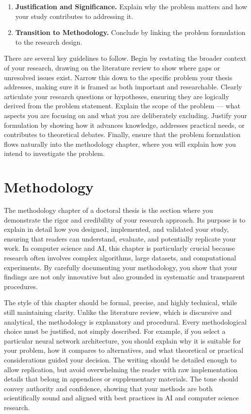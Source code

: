 \documentclass[PCOM,Thesis,Review]{mpThesis}
\newcommand{\Hd}[1]{{\color{SteelBlue}\bf#1.}}
\begin{document}
\begin{MainMatter}
\begin{Remark}
\begin{enumerate}
\item \Hd{Justification and Significance}
Explain why the problem matters and how your study contributes to addressing it.

\item \Hd{Transition to Methodology}
Conclude by linking the problem formulation to the research design.
\end{enumerate}

There are several key guidelines to follow.
Begin by restating the broader context of your research, drawing on the literature review to show where gaps or unresolved issues exist.
Narrow this down to the specific problem your thesis addresses, making sure it is framed as both important and researchable.
Clearly articulate your research questions or hypotheses, ensuring they are logically derived from the problem statement.
Explain the scope of the problem --- what aspects you are focusing on and what you are deliberately excluding.
Justify your formulation by showing how it advances knowledge, addresses practical needs, or contributes to theoretical debates.
Finally, ensure that the problem formulation flows naturally into the methodology chapter, where you will explain how you intend to investigate the problem.
\end{Remark}

\chapter{Methodology}
\label{ch:method}
\minitoc

\begin{Remark}
The methodology chapter of a doctoral thesis is the section where you demonstrate the rigor and credibility of your research approach.
Its purpose is to explain in detail how you designed, implemented, and validated your study,
ensuring that readers can understand, evaluate, and potentially replicate your work.
In computer science and AI, this chapter is particularly crucial because research often involves complex algorithms, large datasets, and computational experiments.
By carefully documenting your methodology, you show that your findings are not only innovative but also grounded in systematic and transparent procedures.

The style of this chapter should be formal, precise, and highly technical, while still maintaining clarity.
Unlike the literature review, which is discursive and analytical, the methodology is explanatory and procedural.
Every methodological choice must be justified, not simply described.
For example, if you select a particular neural network architecture, you should explain why it is suitable for your problem,
how it compares to alternatives, and what theoretical or practical considerations guided your decision.
The writing should be detailed enough to allow replication, but avoid overwhelming the reader with raw implementation details that belong in appendices or supplementary materials.
The tone should convey authority and confidence, showing that your methods are both scientifically sound and aligned with best practices in AI and computer science research.


\end{Remark}
\end{MainMatter}
\end{document}
